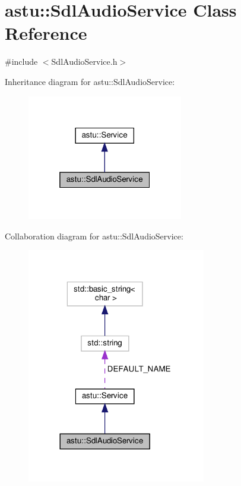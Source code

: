 \hypertarget{classastu_1_1SdlAudioService}{}\section{astu\+:\+:Sdl\+Audio\+Service Class Reference}
\label{classastu_1_1SdlAudioService}


{\ttfamily \#include $<$Sdl\+Audio\+Service.\+h$>$}



Inheritance diagram for astu\+:\+:Sdl\+Audio\+Service\+:\nopagebreak
\begin{figure}[H]
\begin{center}
\leavevmode
\includegraphics[width=193pt]{classastu_1_1SdlAudioService__inherit__graph}
\end{center}
\end{figure}


Collaboration diagram for astu\+:\+:Sdl\+Audio\+Service\+:\nopagebreak
\begin{figure}[H]
\begin{center}
\leavevmode
\includegraphics[width=221pt]{classastu_1_1SdlAudioService__coll__graph}
\end{center}
\end{figure}
